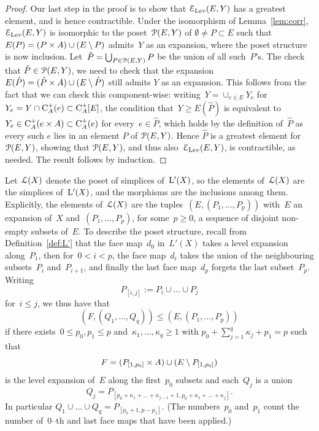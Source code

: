 \begin{proof}
Our last step in the proof is to show that $\mathcal{E}_{\textrm Lev}(E,Y)$ has a greatest element, and is hence contractible. 
Under the isomorphism of  Lemma~\ref{lem:corr}, $\mathcal{E}_{\textrm Lev}(E,Y)$ is isomorphic to the poset~$\mathcal{P}(E,Y)$ of $\emptyset\neq P\subset E$ such that~\hbox{$E(P)=(P\times A)\cup (E\setminus P)$} admits~$Y$ as an expansion, where the poset structure is now inclusion.  Let~$\hat P=\bigcup_{P\in \mathcal{P}(E,Y)} P$ be the union of all such~$P$'s. The check that $\hat P\in \mathcal{P}(E,Y)$, we need to check that the expansion~$E(\hat P)=(\hat P\times A)\cup (E\setminus \hat P)$ still admits $Y$ as an expansion. This follows from the fact that we can check this component-wise: writing~$Y=\cup_{e\in E}Y_e$ for~$Y_e=Y\cap \mathrm{C}_A^+(e)\subset \mathrm{C}_A^+[E]$, the condition that~$Y\ge E(\hat P)$ is equivalent to~$Y_e\in \mathrm{C}_A^+(e\times A)\subset \mathrm{C}_A^+(e)$ for every~$e\in \hat P$, which holds by the definition of~$\hat P$ as every such $e$ lies in an element $P$ of $\mathcal{P}(E,Y)$. Hence $\hat P$ is a greatest element for $\mathcal{P}(E,Y)$, showing that    $\mathcal{P}(E,Y)$, and thus also~$\mathcal{E}_{\textrm Lev}(E,Y)$, is contractible, as needed. The result follows by induction. 
\end{proof}

Let~$\mathcal{L}(X)$ denote the poset of simplices of~$\mathrm{L}'(X)$, so the elements of~$\mathcal{L}(X)$ are the simplices of~$\mathrm{L}'(X)$, and the morphisms are the inclusions among them. 
Explicitly, the elements of~$\mathcal{L}(X)$ are the  tuples~$ (E,(P_1,\dots,P_p))$ with~$E$ an expansion of~$X$ and~$(P_1,\dots,P_p)$, for some~$p\ge 0$, a sequence of disjoint non-empty subsets of~$E$. 
To describe the poset structure, recall from Definition~\ref{def:L'} that the face map~$d_0$ in~$L'(X)$ takes a level expansion along~$P_1$, then for~$0<i<p$, the face map~$d_i$ takes the union of the neighbouring subsets~$P_i$ and~$P_{i+1}$, and finally the last face map~$d_p$ forgets the last subset~$P_p$. 
Writing
\[
P_{[i,j]}:=P_i\cup \dots\cup P_j
\]
for~$i\le j$, we thus have that
\[
(F,(Q_1,\dots,Q_q))\le (E,(P_1,\dots,P_p))
\]
if there exists~$0\le p_0,p_1\le p$ and~$\kappa_1,\dots,\kappa_q\ge 1$ with 
$p_0+\sum_{j=1}^q\kappa_j+p_1=p$
such that 
$$F=(P_{[1,p_0]}\times A)\cup (E\setminus P_{[1,p_0]})$$ is the level expansion of~$E$ along the first~$p_0$ subsets and 
each~$Q_j$ is a union
\[
Q_j=P_{[p_0+\kappa_1+\dots+\kappa_{j-1}+1,p_0+\kappa_1+\dots+\kappa_j]}.
\]
In particular 
$Q_1\cup\dots \cup Q_q=P_{[p_0+1,p-p_1]}$. (The numbers~$p_0$ and~$p_1$ count the number of~$0$--th and last face maps that have been applied.) 



